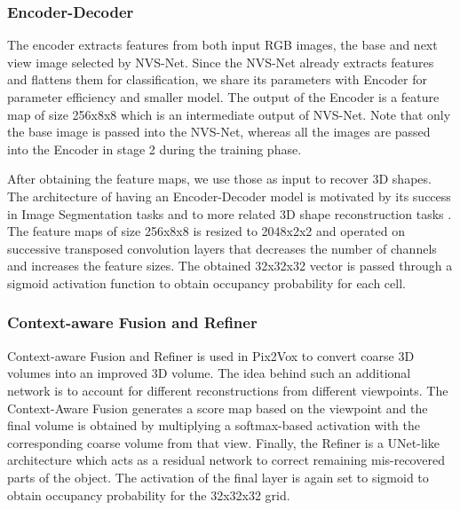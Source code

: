 \subsubsection{Encoder-Decoder}
The encoder extracts features from both input RGB images, the base and next view image selected by NVS-Net. Since the NVS-Net already extracts features and flattens them for classification, we share its parameters with Encoder for parameter efficiency and smaller model. The output of the Encoder is a feature map of size 256x8x8 which is an intermediate output of NVS-Net. Note that only the base image is passed into the NVS-Net, whereas all the images are passed into the Encoder in stage 2 during the training phase.

After obtaining the feature maps, we use those as input to recover 3D shapes. The architecture of having an Encoder-Decoder model is motivated by its success in Image Segmentation tasks \cite{7803544} and to more related 3D shape reconstruction tasks \cite{pix2vox}. The feature maps of size 256x8x8 is resized to 2048x2x2 and operated on successive transposed convolution layers that decreases the number of channels and increases the feature sizes. The obtained 32x32x32 vector is passed through a sigmoid activation function to obtain occupancy probability for each cell.
\subsubsection{Context-aware Fusion and Refiner}
Context-aware Fusion and Refiner is used in Pix2Vox \cite{pix2vox}  to convert coarse 3D volumes into an improved 3D volume. The idea behind such an additional network is to account for different reconstructions from different viewpoints. The Context-Aware Fusion generates a score map based on the viewpoint and the final volume is obtained by multiplying a softmax-based activation with the corresponding coarse volume from that view. Finally, the Refiner is a UNet-like architecture \cite{unet} which acts as a residual network to correct remaining mis-recovered parts of the object. The activation of the final layer is again set to sigmoid to obtain occupancy probability for the 32x32x32 grid.
